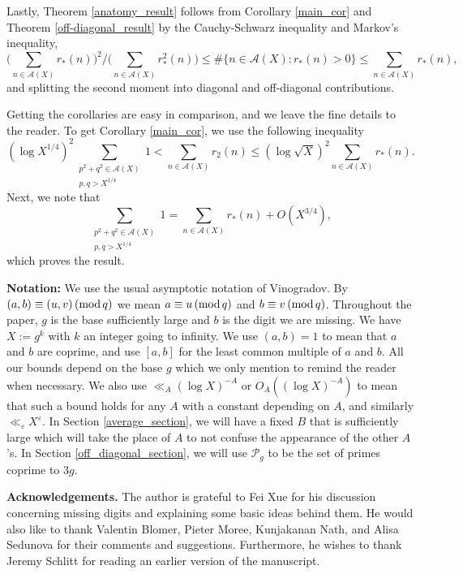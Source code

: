\documentclass[12pt]{amsart}
\theoremstyle{definition}
\theoremstyle{definition}
\theoremstyle{remark}
\numberwithin{equation}{section}
\newcommand{\CA}{\mathcal{A}}
\newcommand{\CP}{\mathcal{P}}
\renewcommand{\leq}{\leqslant}
\renewcommand{\mod}[1]{\,({\rm mod}\,#1)}
\begin{document}
Lastly, Theorem \ref{anatomy_result} follows from Corollary \ref{main_cor} and Theorem \ref{off-diagonal_result} by the Cauchy-Schwarz inequality and Markov's inequality,
$$ \bigg(\sum_{n\in\CA(X)} r_*(n) \bigg)^2 \bigg/ \bigg( \sum_{n\in \CA(X)} r_*^2(n)\bigg) \leq \#\{ n\in \CA(X) : r_*(n)>0\} \leq \sum_{n\in \CA(X)} r_*(n) ,$$
and splitting the second moment into diagonal and off-diagonal contributions.

Getting the corollaries are easy in comparison, and we leave the fine details to the reader. To get Corollary \ref{main_cor}, we use the following inequality
$$ (\log X^{1/4})^2 \sum_{\substack{p^2+q^2 \in \CA(X) \\ p,q>X^{1/4}}} 1 < \sum_{n\in \CA(X)} r_2(n) \leq (\log \sqrt{X})^2 \sum_{n\in \CA(X)} r_*(n). $$
Next, we note that
$$ \sum_{\substack{p^2+q^2 \in \CA(X) \\ p,q>X^{1/4}}} 1 = \sum_{n\in \CA(X)} r_*(n) + O(X^{3/4}), $$
which proves the result.







\textbf{Notation:} We use the usual asymptotic notation of Vinogradov. By $(a,b)\equiv (u,v) \mod q$ we mean $a\equiv u \mod q$ and $b\equiv v \mod q$. Throughout the paper, $g$ is the base sufficiently large and $b$ is the digit we are missing. We have $X:=g^k$ with $k$ an integer going to infinity. We use $(a,b)=1$ to mean that $a$ and $b$ are coprime, and use $[a,b]$ for the least common multiple of $a$ and $b$. All our bounds depend on the base $g$ which we only mention to remind the reader when necessary. We also use $\ll_A (\log X)^{-A}$ or $O_A((\log X)^{-A})$ to mean that such a bound holds for any $A$ with a constant depending on $A$, and similarly $\ll_{\varepsilon} X^{\varepsilon}$. In Section \ref{average_section}, we will have a fixed $B$ that is sufficiently large which will take the place of $A$ to not confuse the appearance of the other $A$'s. In Section \ref{off_diagonal_section}, we will use $\CP_g$ to be the set of primes coprime to $3g$.




\textbf{Acknowledgements.}
The author is grateful to Fei Xue for his discussion concerning missing digits and explaining some basic ideas behind them. He would also like to thank Valentin Blomer, Pieter Moree, Kunjakanan Nath, and Alisa Sedunova for their comments and suggestions. Furthermore, he wishes to thank Jeremy Schlitt for reading an earlier version of the manuscript.
\end{document}
